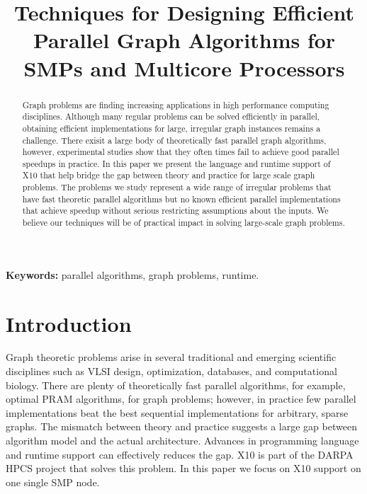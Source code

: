 \documentclass{llncs}
\begin{document}

\title{Techniques for Designing Efficient Parallel Graph
  Algorithms for SMPs and Multicore Processors}
\author{ }
\institute{}
\maketitle

\begin{abstract}
  Graph problems are finding increasing applications in high
performance computing disciplines. Although many regular problems 
can be solved efficiently in parallel, obtaining efficient
  implementations for large, irregular graph instances remains a challenge.
 There exisit a large body of theoretically fast parallel graph algorithms, however, 
 experimental studies show that they often times fail to achieve good parallel speedups 
 in practice. 
 In this paper we present the language and runtime support of X10 that help 
 bridge the gap between theory and practice for large scale graph problems. 
 The problems we study represent a wide range of irregular problems that have fast
  theoretic parallel algorithms but no known efficient
  parallel implementations that achieve speedup without serious restricting assumptions about the inputs.
We believe our techniques will be of  practical impact in solving large-scale graph problems.
\end{abstract}

\noindent
\textbf{Keywords:}
 parallel algorithms, graph problems, runtime.

\section{Introduction}
\label{s:intr}
 Graph theoretic problems arise in several traditional and emerging scientific disciplines such as VLSI design, optimization, databases, and computational biology. There are plenty of theoretically fast parallel algorithms, for example, optimal PRAM algorithms, for graph problems; however, in
 practice few parallel implementations beat the best sequential implementations for arbitrary, sparse
 graphs. The mismatch between theory and practice suggests a large gap between algorithm model and the actual architecture. Advances in programming language and runtime support can effectively reduces the gap.
 X10 is part of the DARPA HPCS project that solves this problem.  In this paper we focus on X10 support on one single SMP node.
 
\end{document}
